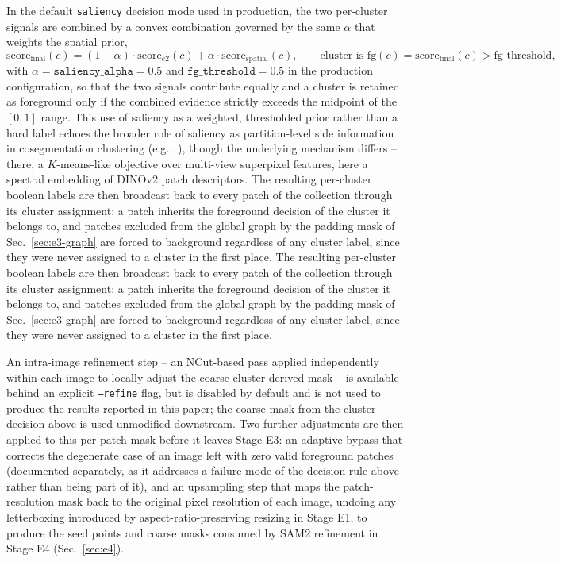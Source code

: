 In the default \texttt{saliency} decision mode used in production, the two per-cluster signals are combined by a convex combination governed by the same $\alpha$ that weights the spatial prior,
\[
\text{score}_{\text{final}}(c) = (1-\alpha) \cdot \text{score}_{e2}(c) + \alpha \cdot \text{score}_{\text{spatial}}(c), \qquad \text{cluster\_is\_fg}(c) = \text{score}_{\text{final}}(c) > \text{fg\_threshold},
\]
with $\alpha = \texttt{saliency\_alpha} = 0.5$ and $\texttt{fg\_threshold} = 0.5$ in the production configuration, so that the two signals contribute equally and a cluster is retained as foreground only if the combined evidence strictly exceeds the midpoint of the $[0,1]$ range. This use of saliency as a weighted, thresholded prior rather than a hard label echoes the broader role of saliency as partition-level side information in cosegmentation clustering (e.g.,~\cite{tao2019mvsgc}), though the underlying mechanism differs -- there, a $K$-means-like objective over multi-view superpixel features, here a spectral embedding of DINOv2 patch descriptors. The resulting per-cluster boolean labels are then broadcast back to every patch of the collection through its cluster assignment: a patch inherits the foreground decision of the cluster it belongs to, and patches excluded from the global graph by the padding mask of Sec.~\ref{sec:e3-graph} are forced to background regardless of any cluster label, since they were never assigned to a cluster in the first place. The resulting per-cluster boolean labels are then broadcast back to every patch of the collection through its cluster assignment: a patch inherits the foreground decision of the cluster it belongs to, and patches excluded from the global graph by the padding mask of Sec.~\ref{sec:e3-graph} are forced to background regardless of any cluster label, since they were never assigned to a cluster in the first place.

An intra-image refinement step -- an NCut-based pass applied independently within each image to locally adjust the coarse cluster-derived mask -- is available behind an explicit \texttt{--refine} flag, but is disabled by default and is not used to produce the results reported in this paper; the coarse mask from the cluster decision above is used unmodified downstream. Two further adjustments are then applied to this per-patch mask before it leaves Stage E3: an adaptive bypass that corrects the degenerate case of an image left with zero valid foreground patches (documented separately, as it addresses a failure mode of the decision rule above rather than being part of it), and an upsampling step that maps the patch-resolution mask back to the original pixel resolution of each image, undoing any letterboxing introduced by aspect-ratio-preserving resizing in Stage E1, to produce the seed points and coarse masks consumed by SAM2 refinement in Stage E4 (Sec.~\ref{sec:e4}).

